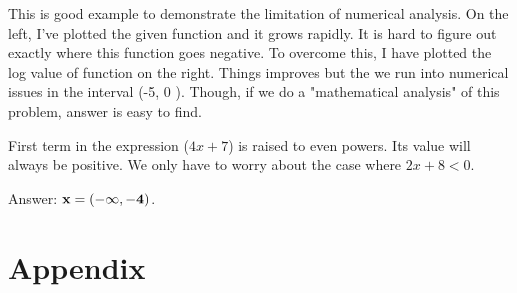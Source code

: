 \documentclass[12pt,answers,addpoints]{exam}
\begin{document}
\begin{questions}
\begin{parts}
\begin{solution}
        This is good example to demonstrate the limitation of numerical analysis. On
        the left, I've plotted the given function and it grows rapidly. It is hard to
        figure out exactly where this function goes negative. To overcome this, I
        have plotted the log value of function on the right. Things improves but the
        we run into numerical issues in the interval (-5, 0 ). Though, if we do a
        "mathematical analysis" of this problem, answer is easy to find.



        First term in the expression ($4x+7$) is raised to even powers.
        Its value will always be positive. We only have to worry about the case where
        $2x+8<0$.  

        Answer: $\bf x = (-\infty, -4)$.  


    \end{solution}

\end{parts}

\end{questions}

\section{Appendix}
\end{document}

